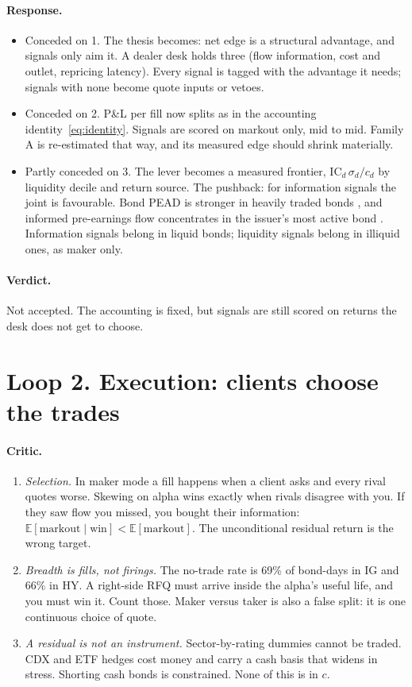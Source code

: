\documentclass[11pt,letterpaper]{article}
\newcommand{\E}{\mathbb{E}}
\begin{document}
\paragraph{Response.}
\begin{itemize}[itemsep=2pt,topsep=2pt]
\item Conceded on 1. The thesis becomes: net edge is a structural advantage, and signals only aim it. A dealer desk holds three (flow information, cost and outlet, repricing latency). Every signal is tagged with the advantage it needs; signals with none become quote inputs or vetoes.
\item Conceded on 2. P\&L per fill now splits as in the accounting identity~\eqref{eq:identity}. Signals are scored on markout only, mid to mid. Family A is re-estimated that way, and its measured edge should shrink materially.
\item Partly conceded on 3. The lever becomes a measured frontier, $\mathrm{IC}_d\,\sigma_d/c_d$ by liquidity decile and return source. The pushback: for information signals the joint is favourable. Bond PEAD is stronger in heavily traded bonds \cite{nqx}, and informed pre-earnings flow concentrates in the issuer's most active bond \cite{wz2016}. Information signals belong in liquid bonds; liquidity signals belong in illiquid ones, as maker only.
\end{itemize}

\paragraph{Verdict.} Not accepted. The accounting is fixed, but signals are still scored on returns the desk does not get to choose.

\section{Loop 2. Execution: clients choose the trades}

\paragraph{Critic.}
\begin{enumerate}[itemsep=2pt,topsep=2pt]
\item \emph{Selection.} In maker mode a fill happens when a client asks and every rival quotes worse. Skewing on alpha wins exactly when rivals disagree with you. If they saw flow you missed, you bought their information: $\E[\text{markout}\mid\text{win}]<\E[\text{markout}]$. The unconditional residual return is the wrong target.
\item \emph{Breadth is fills, not firings.} The no-trade rate is 69\% of bond-days in IG and 66\% in HY. A right-side RFQ must arrive inside the alpha's useful life, and you must win it. Count those. Maker versus taker is also a false split: it is one continuous choice of quote.
\item \emph{A residual is not an instrument.} Sector-by-rating dummies cannot be traded. CDX and ETF hedges cost money and carry a cash basis that widens in stress. Shorting cash bonds is constrained. None of this is in $c$.
\end{enumerate}
\end{document}
